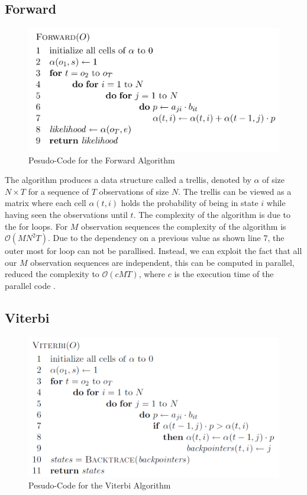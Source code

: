 \documentclass[english, paper=a4]{scrartcl}
\begin{document}
\subsection{Forward}

\begin{figure}[H]

\centering
\includegraphics[scale=0.4]{"FW"}
 \caption{Pesudo-Code for the Forward Algorithm \cite{cuhmm}}

\end{figure}

The algorithm produces a data structure called a trellis, denoted by \(\alpha\) of size \(N \times T \) for a sequence of $T$ observations of size $N$. The trellis can be viewed as a matrix where each cell \(\alpha(t,i)\) holds the probability of being in state \(i\) while having seen the observations until \(t\). The complexity of the algorithm is due to the for loops. For \(M\) observation sequences the complexity of the algorithm is 
$\mathcal{O}(MN^2T)$. Due to the dependency on a previous value as shown line 7, the outer most for loop can not be parallised. Instead, we can exploit the fact that all our \(M\) observation sequences are independent, this can be computed in parallel, reduced the complexity to $\mathcal{O}(cMT)$, where $c$ is the execution time of the parallel code \cite{cuhmm}.
\subsection{Viterbi}

\begin{figure}[H]

\centering
\includegraphics[scale=0.4]{"vit"}
 \caption{Pesudo-Code for the Viterbi Algorithm \cite{cuhmm}}

\end{figure}
\end{document}
